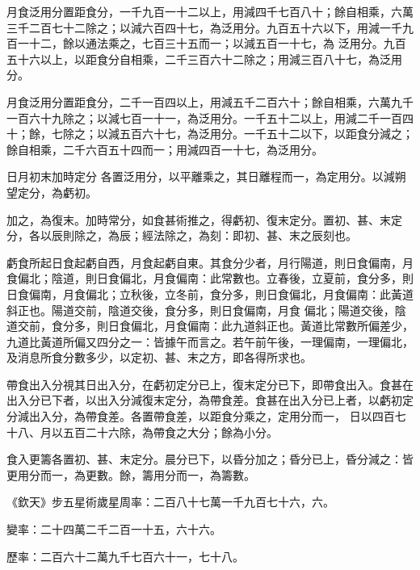 \begin{pinyinscope}
 月食泛用分置距食分，一千九百一十二以上，用減四千七百八十；餘自相乘，六萬三千二百七十二除之；以減六百四十七，為泛用分。九百五十六以下，用減一千九百一十二，餘以通法乘之，七百三十五而一；以減五百一十七，為
 泛用分。九百五十六以上，以距食分自相乘，二千三百六十二除之；用減三百八十七，為泛用分。



 月食泛用分置距食分，二千一百四以上，用減五千二百六十；餘自相乘，六萬九千一百六十九除之；以減七百一十一，為泛用分。一千五十二以上，用減二千一百四十；餘，七除之；以減五百六十七，為泛用分。一千五十二以下，以距食分減之；餘自相乘，二千六百五十四而一；用減四百一十七，為泛用分。



 日月初末加時定分
 各置泛用分，以平離乘之，其日離程而一，為定用分。以減朔望定分，為虧初。



 加之，為復末。加時常分，如食甚術推之，得虧初、復末定分。置初、甚、末定分，各以辰則除之，為辰；經法除之，為刻：即初、甚、末之辰刻也。



 虧食所起日食起虧自西，月食起虧自東。其食分少者，月行陽道，則日食偏南，月食偏北；陰道，則日食偏北，月食偏南：此常數也。立春後，立夏前，食分多，則日食偏南，月食偏北；立秋後，立冬前，食分多，則日食偏北，月食偏南：此黃道斜正也。陽道交前，陰道交後，食分多，則日食偏南，月食
 偏北；陽道交後，陰道交前，食分多，則日食偏北，月食偏南：此九道斜正也。黃道比常數所偏差少，九道比黃道所偏又四分之一：皆據午而言之。若午前午後，一理偏南，一理偏北，及消息所食分數多少，以定初、甚、末之方，即各得所求也。



 帶食出入分視其日出入分，在虧初定分已上，復末定分已下，即帶食出入。食甚在出入分已下者，以出入分減復末定分，為帶食差。食甚在出入分已上者，以虧初定分減出入分，為帶食差。各置帶食差，以距食分乘之，定用分而一，
 日以四百七十八、月以五百二十六除，為帶食之大分；餘為小分。



 食入更籌各置初、甚、末定分。晨分已下，以昏分加之；昏分已上，昏分減之：皆更用分而一，為更數。餘，籌用分而一，為籌數。



 《欽天》步五星術歲星周率：二百八十七萬一千九百七十六，六。



 變率：二十四萬二千二百一十五，六十六。



 歷率：二百六十二萬九千七百六十一，七十八。




\end{pinyinscope}
